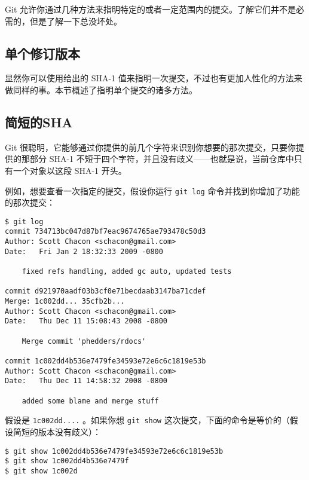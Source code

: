 \documentclass[a4paper]{book}
\begin{document}
Git 允许你通过几种方法来指明特定的或者一定范围内的提交。了解它们并不是必需的，但是了解一下总没坏处。

\subsection{单个修订版本}

显然你可以使用给出的 SHA-1 值来指明一次提交，不过也有更加人性化的方法来做同样的事。本节概述了指明单个提交的诸多方法。

\subsection{简短的SHA}

Git 很聪明，它能够通过你提供的前几个字符来识别你想要的那次提交，只要你提供的那部分 SHA-1 不短于四个字符，并且没有歧义------也就是说，当前仓库中只有一个对象以这段 SHA-1 开头。

例如，想要查看一次指定的提交，假设你运行 \texttt{git log} 命令并找到你增加了功能的那次提交：

\begin{shaded}\begin{verbatim}
$ git log
commit 734713bc047d87bf7eac9674765ae793478c50d3
Author: Scott Chacon <schacon@gmail.com>
Date:   Fri Jan 2 18:32:33 2009 -0800

    fixed refs handling, added gc auto, updated tests

commit d921970aadf03b3cf0e71becdaab3147ba71cdef
Merge: 1c002dd... 35cfb2b...
Author: Scott Chacon <schacon@gmail.com>
Date:   Thu Dec 11 15:08:43 2008 -0800

    Merge commit 'phedders/rdocs'

commit 1c002dd4b536e7479fe34593e72e6c6c1819e53b
Author: Scott Chacon <schacon@gmail.com>
Date:   Thu Dec 11 14:58:32 2008 -0800

    added some blame and merge stuff
\end{verbatim}\end{shaded}

假设是 \texttt{1c002dd....} 。如果你想 \texttt{git show} 这次提交，下面的命令是等价的（假设简短的版本没有歧义）：

\begin{shaded}\begin{verbatim}
$ git show 1c002dd4b536e7479fe34593e72e6c6c1819e53b
$ git show 1c002dd4b536e7479f
$ git show 1c002d
\end{verbatim}\end{shaded}
\end{document}
